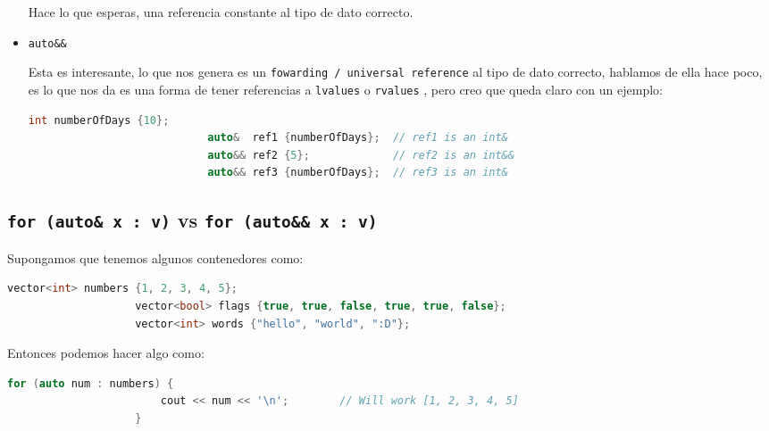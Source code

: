 \documentclass[12pt, fleqn]{report}                             %
\theoremstyle{break}                                            %
\newcommand{\textCode}[1]  { \texttt{#1} }                      %
\begin{document}
\begin{itemize}
                        Hace lo que esperas, una referencia constante al tipo de dato correcto.

                    \item \textCode{auto\&\&}
                    
                        Esta es interesante, lo que nos genera es un \textCode{fowarding / universal reference}
                        al tipo de dato correcto, hablamos de ella hace poco, es lo que nos da es una 
                        forma de tener referencias a \textCode{lvalues} o \textCode{rvalues}, pero creo 
                        que queda claro con un ejemplo:
                        \begin{lstlisting}[language=C++, gobble=28]
                            int numberOfDays {10};
                            auto&  ref1 {numberOfDays};  // ref1 is an int&
                            auto&& ref2 {5};             // ref2 is an int&&
                            auto&& ref3 {numberOfDays};  // ref3 is an int&
                        \end{lstlisting}

                \end{itemize}

     
            \clearpage
            \subsection{ \textCode{for (auto\& x : v)} vs \textCode{for (auto\&\& x : v)} } 
            
                Supongamos que tenemos algunos contenedores como:
                \begin{lstlisting}[language=C++, gobble=20]
                    vector<int> numbers {1, 2, 3, 4, 5};
                    vector<bool> flags {true, true, false, true, true, false};
                    vector<int> words {"hello", "world", ":D"};
                \end{lstlisting}

                Entonces podemos hacer algo como:
                \begin{lstlisting}[language=C++, gobble=20]
                    for (auto num : numbers) {
                        cout << num << '\n';        // Will work [1, 2, 3, 4, 5]
                    }
                \end{lstlisting}
\end{document}
